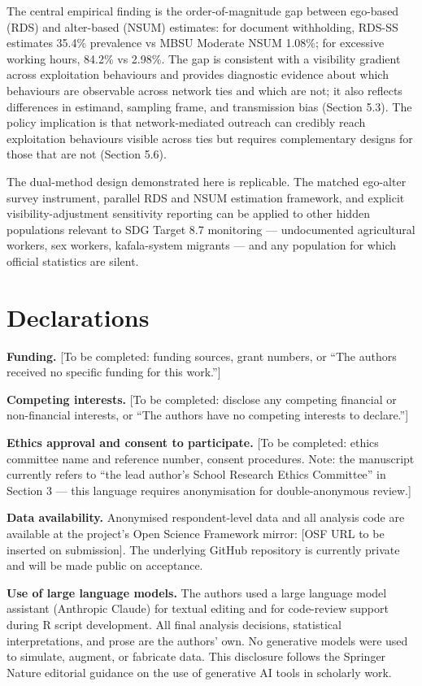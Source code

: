 \documentclass[
  12pt,
  letterpaper,
  DIV=11,
  numbers=noendperiod]{scrartcl}
\begin{document}
The central empirical finding is the order-of-magnitude gap between
ego-based (RDS) and alter-based (NSUM) estimates: for document
withholding, RDS-SS estimates 35.4\% prevalence vs MBSU Moderate NSUM
1.08\%; for excessive working hours, 84.2\% vs 2.98\%. The gap is
consistent with a visibility gradient across exploitation behaviours and
provides diagnostic evidence about which behaviours are observable
across network ties and which are not; it also reflects differences in
estimand, sampling frame, and transmission bias (Section 5.3). The
policy implication is that network-mediated outreach can credibly reach
exploitation behaviours visible across ties but requires complementary
designs for those that are not (Section 5.6).

The dual-method design demonstrated here is replicable. The matched
ego-alter survey instrument, parallel RDS and NSUM estimation framework,
and explicit visibility-adjustment sensitivity reporting can be applied
to other hidden populations relevant to SDG Target 8.7 monitoring ---
undocumented agricultural workers, sex workers, kafala-system migrants
--- and any population for which official statistics are silent.

\section{Declarations}\label{declarations}

\textbf{Funding.} {[}To be completed: funding sources, grant numbers, or
``The authors received no specific funding for this work.''{]}

\textbf{Competing interests.} {[}To be completed: disclose any competing
financial or non-financial interests, or ``The authors have no competing
interests to declare.''{]}

\textbf{Ethics approval and consent to participate.} {[}To be completed:
ethics committee name and reference number, consent procedures. Note:
the manuscript currently refers to ``the lead author's School Research
Ethics Committee'' in Section 3 --- this language requires anonymisation
for double-anonymous review.{]}

\textbf{Data availability.} Anonymised respondent-level data and all
analysis code are available at the project's Open Science Framework
mirror: {[}OSF URL to be inserted on submission{]}. The underlying
GitHub repository is currently private and will be made public on
acceptance.

\textbf{Use of large language models.} The authors used a large language
model assistant (Anthropic Claude) for textual editing and for
code-review support during R script development. All final analysis
decisions, statistical interpretations, and prose are the authors' own.
No generative models were used to simulate, augment, or fabricate data.
This disclosure follows the Springer Nature editorial guidance on the
use of generative AI tools in scholarly work.
\end{document}
